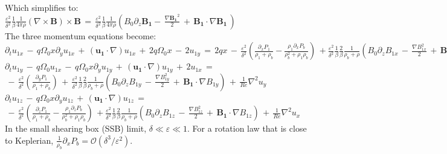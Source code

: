 \documentclass[letterpaper,12pt]{article}
\newcommand\reye{\mathrel{Re}}
\begin{document}
Which simplifies to: \\

$\frac{\varepsilon^2}{\delta^2} \frac{1}{\beta} \frac{1}{4 \pi \rho} \left( \nabla \times \mathbf{B} \right) \times \mathbf{B} \, = \, \frac{\varepsilon^2}{\delta^2} \frac{1}{\beta} \frac{1}{4 \pi \rho} \left(B_0 \partial_z \mathbf{B_1} - \, \frac{\nabla \mathbf{B_1}^2}{2} \, + \, \mathbf{B_1}\cdot \nabla \mathbf{B_1} \, \right)$ \\

The three momentum equations become: \\

$\partial_t u_{1x} \, - \, q \Omega_0 x \partial_y u_{1x} \,+ \, \left(\mathbf{u_1} \cdot \nabla\right)u_{1x} \, + \, 2 q \Omega_0 x \, - \, 2 u_{1y}\,= \, 2 q x \, - \, \frac{\varepsilon^2}{\delta^2} \left( \frac{\partial_x P_1}{\rho_1 + \rho_b} - \frac{\rho_1\partial_x P_b}{\rho_b^2 + \rho_1\rho_b}\right) \, + \frac{\varepsilon^2}{\delta^2} \frac{1}{\beta} \frac{2}{\beta} \frac{1}{\rho_b + \rho} \left( B_0 \partial_z B_{1x} \,- \, \frac{\nabla B_{1x}^2}{2} \, + \, \mathbf{B_1}\cdot \nabla B_{1x} \right) \, + \, \frac{1}{\reye}\nabla^2 u_x  $ \\

$\partial_t u_{1y} \, - \, q \Omega_0 u_{1x} \, - \, q \Omega_0 x \partial_y u_{1y} \,+ \, \left(\mathbf{u_1} \cdot \nabla\right)u_{1y} \,+ \, 2u_{1x} \, =  $\\
$\, - \, \frac{\varepsilon^2}{\delta^2} \left( \frac{\partial_y P_1}{\rho_1 + \rho_b} \right) \, + \, \frac{\varepsilon^2}{\delta^2} \frac{1}{\beta} \frac{2}{\beta} \frac{1}{\rho_b + \rho} \left( B_0 \partial_z B_{1y} \,- \, \frac{\nabla B_{1y}^2}{2} \, + \, \mathbf{B_1}\cdot \nabla B_{1y} \right) \, + \, \frac{1}{\reye}\nabla^2 u_y  $ \\

$\partial_t u_{1z} \, - \, q \Omega_0 x \partial_y u_{1z} \,+ \, \left(\mathbf{u_1} \cdot \nabla\right)u_{1z} \, = $\\
$\, - \, \frac{\varepsilon^2}{\delta^2} \left( \frac{\partial_z P_1}{\rho_1 + \rho_b} - \frac{\rho_1\partial_z P_b}{\rho_b^2 + \rho_1\rho_b}\right) \, + \frac{\varepsilon^2}{\delta^2} \frac{1}{\beta} \frac{2}{\beta} \frac{1}{\rho_b + \rho} \left( B_0 \partial_z B_{1z} \,- \, \frac{\nabla B_{1z}^2}{2} \, + \, \mathbf{B_1}\cdot \nabla B_{1z} \right) \, + \, \frac{1}{\reye}\nabla^2 u_x  $ \\

In the small shearing box (SSB) limit, $\delta \ll \varepsilon \ll 1$. For a rotation law that is close to Keplerian, $\frac{1}{\rho_b}\partial_xP_b = \mathcal{O}\left(\delta^3/\varepsilon^2\right). $
\end{document}
